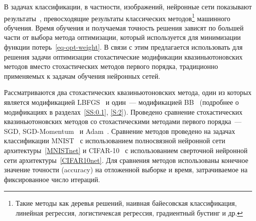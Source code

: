 \documentclass[preprint,12pt]{elsarticle}
\begin{document}
В задачах классификации, в частности, изображений, нейронные сети показывают результаты~\cite{MNISTexperiments, CIFAR10experiments}, превосходящие результаты классических методов\footnote{Такие методы как деревья решений, наивная байесовская классификация, линейная регрессия, логистичексая регрессия, градиентный бустинг и др.} машинного обучения. 
Время обучения и получаемая точность решения зависят по большей части от выбора метода оптимизации, который используется для минимизации функции потерь~\ref{eq-opt-weight}. 
В связи с этим предлагается использовать для решения задачи оптимизации стохастические модификации квазиньютоновских методов вместо стохастических методов первого порядка, традиционно применяемых к задачам обучения нейронных сетей.


Рассматриваются два стохастических квазиньютоновских метода, \linebreak один из которых является модификацией LBFGS~\cite{BFGSorig} и один~--- модификацией BB~\cite{BBorig} (подробнее о модификациях в разделах~\ref{SS:0.1}, \ref{S:2}). 
Проведено сравнение стохастических квазиньютоновских методов со стохастическими методами первого порядка~--- SGD, SGD-Momentum~\cite{GDoverview} и Adam~\cite{adam}. 
Сравнение методов проведено на задачах классификации MNIST~\cite{MNIST} с использованием полносвязной нейронной сети архитектуры~\ref{MNISTnet} и CIFAR-10~\cite{CIFAR10} с использованием сверточной нейронной сети архитектуры~\ref{CIFAR10net}.
Для сравнения методов использованы  конечное значение точности (accuracy) на отложенной выборке и время, затрачиваемое на фиксированное число итераций.
\end{document}
